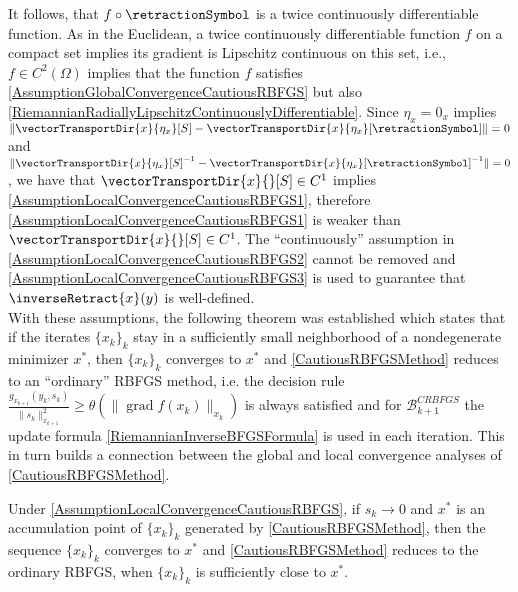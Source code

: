 It follows, that $f \circ \retractionSymbol$ is a twice continuously differentiable function. As in the Euclidean, a twice continuously differentiable function $f$ on a compact set implies its gradient is Lipschitz continuous on this set, i.e., $f \in C^2 (\Omega)$ implies that the function $f$ satisfies \cref{AssumptionGlobalConvergenceCautiousRBFGS} but also \cref{RiemannianRadiallyLipschitzContinuouslyDifferentiable}. Since $\eta_x = 0_x$ implies $\lVert \vectorTransportDir{x}{\eta_x}[S] - \vectorTransportDir{x}{\eta_x}[\retractionSymbol] \rVert = 0$ and $\lVert {\vectorTransportDir{x}{\eta_x}[S]}^{-1} - {\vectorTransportDir{x}{\eta_x}[\retractionSymbol]}^{-1} \rVert = 0$, we have that $\vectorTransportDir{x}{}[S] \in C^1$ implies \cref{AssumptionLocalConvergenceCautiousRBFGS1}, therefore \cref{AssumptionLocalConvergenceCautiousRBFGS1} is weaker than $\vectorTransportDir{x}{}[S] \in C^1$. The “continuously” assumption in \cref{AssumptionLocalConvergenceCautiousRBFGS2} cannot be removed and \cref{AssumptionLocalConvergenceCautiousRBFGS3} is used to guarantee that $\inverseRetract{x}(y)$ is well-defined. \\
With these assumptions, the following theorem was established which states that if the iterates $\{ x_k \}_k$ stay in a sufficiently small neighborhood of a nondegenerate minimizer $x^*$, then $\{ x_k \}_k$ converges to $x^*$ and \cref{CautiousRBFGSMethod} reduces to an “ordinary” RBFGS method, i.e. the decision rule $\frac{g_{x_{k+1}}(y_k,s_k)}{\lVert s_k \rVert^{2}_{x_{k+1}}} \geq \theta(\lVert \operatorname{grad} f(x_k) \rVert_{x_k})$ is always satisfied and for $\mathcal{B}^{CRBFGS}_{k+1}$ the update formula \cref{RiemannianInverseBFGSFormula} is used in each iteration. This in turn builds a connection between the global and local convergence analyses of \cref{CautiousRBFGSMethod}.

\begin{theorem} 
    Under \cref{AssumptionLocalConvergenceCautiousRBFGS}, if $s_k \to 0$ and $x^*$ is an accumulation point of $\{ x_k \}_k$ generated by \cref{CautiousRBFGSMethod}, then the sequence $\{ x_k \}_k$ converges to $x^*$ and \cref{CautiousRBFGSMethod} reduces to the ordinary RBFGS, when $\{ x_k \}_k$ is sufficiently close to $x^*$.
\end{theorem}

